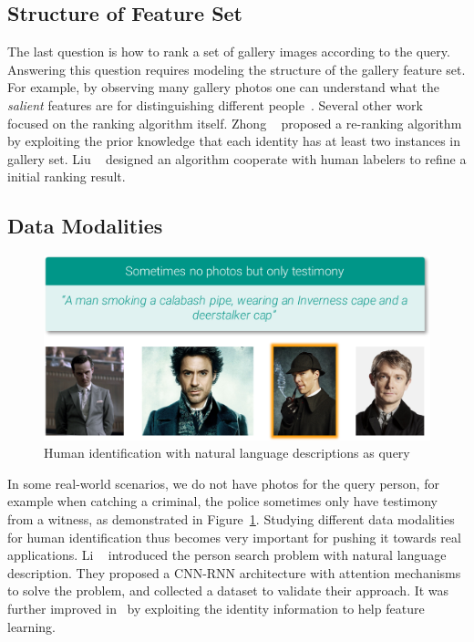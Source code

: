 \subsection{Structure of Feature Set} %
\label{sub:human-id-structure-set}
The last question is how to rank a set of gallery images according to the query. Answering this question requires modeling the structure of the gallery feature set. For example, by observing many gallery photos one can understand what the \emph{salient} features are for distinguishing different people~\cite{zhao2013unsupervised,zhao2017person}. Several other work focused on the ranking algorithm itself. Zhong \etal~\cite{zhong2017re} proposed a re-ranking algorithm by exploiting the prior knowledge that each identity has at least two instances in gallery set. Liu \etal~\cite{liu2013pop} designed an algorithm cooperate with human labelers to refine a initial ranking result.

\subsection{Data Modalities} %
\label{sub:human-id-data-modalities}
\begin{figure}[t]
\begin{center}
\includegraphics[width=1.0\linewidth]{figures/text-based-reid.pdf}
\caption{Human identification with natural language descriptions as query}
\label{fig:human-id-text-based-reid}
\end{center}
\end{figure}
In some real-world scenarios, we do not have photos for the query person, for example when catching a criminal, the police sometimes only have testimony from a witness, as demonstrated in Figure~\ref{fig:human-id-text-based-reid}. Studying different data modalities for human identification thus becomes very important for pushing it towards real applications. Li \etal~\cite{li2017person} introduced the person search problem with natural language description. They proposed a CNN-RNN architecture with attention mechanisms to solve the problem, and collected a dataset to validate their approach. It was further improved in~\cite{li2017identity} by exploiting the identity information to help feature learning.

